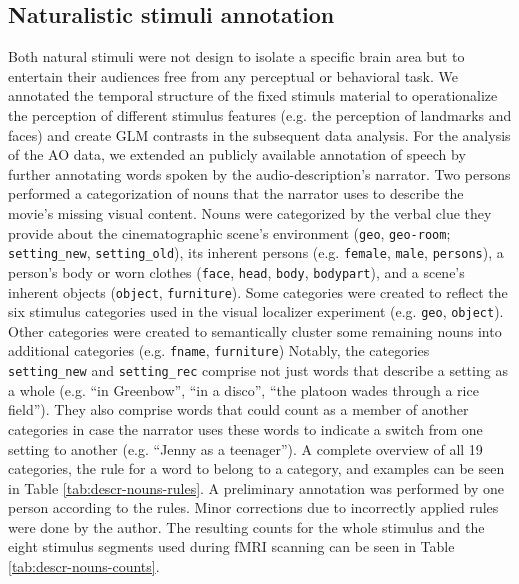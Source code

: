 \documentclass[english]{article}
\begin{document}
\subsection{Naturalistic stimuli annotation}
Both natural stimuli were not design to isolate a specific brain area but to
entertain their audiences free from any perceptual or behavioral task.
We annotated the temporal structure of the fixed stimuls material to
operationalize the perception of different stimulus features (e.g. the
perception of landmarks and faces) and create GLM contrasts in the subsequent
data analysis.
For the analysis of the AO data, we extended an publicly available annotation of
speech \citep{haeusler2020speechanno} by further annotating words spoken by the
audio-description's narrator.
Two persons performed a categorization of nouns that the narrator uses to
describe the movie's missing visual content.
Nouns were categorized by the verbal clue they provide about the cinematographic
scene's environment (\texttt{geo}, \texttt{geo-room}; \texttt{setting\_new},
\texttt{setting\_old}), its inherent persons (e.g. \texttt{female},
\texttt{male}, \texttt{persons}), a person's body or worn clothes
(\texttt{face}, \texttt{head}, \texttt{body}, \texttt{bodypart}), and a scene's
inherent objects (\texttt{object}, \texttt{furniture}).
Some categories were created to reflect the six stimulus categories used in the
visual localizer experiment (e.g. \texttt{geo}, \texttt{object}).
Other categories were created to semantically cluster some remaining nouns into
additional categories (e.g. \texttt{fname}, \texttt{furniture})
Notably, the categories \texttt{setting\_new} and \texttt{setting\_rec} comprise
not just words that describe a setting as a whole (e.g. ``in Greenbow'', ``in a
disco'', ``the platoon wades through a rice field''). They also comprise words
that could count as a member of another categories in case the narrator uses
these words to indicate a switch from one setting to another (e.g. ``Jenny as a
teenager'').
A complete overview of all 19 categories, the rule for a word to belong to a
category, and examples can be seen in Table \ref{tab:descr-nouns-rules}.
A preliminary annotation was performed by one person according to the rules.
Minor corrections due to incorrectly applied rules were done by the author.
The resulting counts for the whole stimulus and the eight stimulus segments used
during fMRI scanning can be seen in Table \ref{tab:descr-nouns-counts}.
\end{document}
